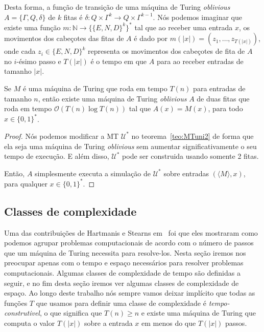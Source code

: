 Desta forma, a função de transição de uma máquina de Turing \emph{oblivious} $A = \{\Gamma, Q, \delta\}$ de $k$ fitas é $\delta: Q \times \Gamma^{k} \to Q \times \Gamma^{k - 1}$. Nós podemos imaginar que existe uma função $m: \mathbb{N} \to \{\{E, N, D\}^{k}\}^{*}$ tal que ao receber uma entrada $x$, os movimentos dos cabeçotes das fitas de $A$ é dado por $m(\lvert x \rvert) = (z_{1}, \dots, z_{T(\lvert x \rvert)})$, onde cada $z_{i} \in \{E, N, D\}^{k}$ representa os movimentos dos cabeçotes de fita de $A$ no $i$-ésimo passo e $T(\lvert x \rvert)$ é o tempo em que $A$ para ao receber entradas de tamanho $\lvert x \rvert$.

\begin{teo}

Se $M$ é uma máquina de Turing que roda em tempo $T(n)$ para entradas de tamanho $n$, então existe uma máquina de Turing \emph{oblivious} $A$ de duas fitas que roda em tempo $\mathcal{O}(T(n)\log T(n))$ tal que $A(x) = M(x)$, para todo $x \in \{0, 1\}^{*}$.

\end{teo}

\begin{proof}

Nós podemos modificar a MT $\mathcal{U}^{*}$ no teorema~\ref{teo:MTuni2} de forma que ela seja uma máquina de Turing \emph{oblivious} sem aumentar significativamente o seu tempo de execução. E além disso, $\mathcal{U}^{*}$ pode ser construida usando somente 2 fitas.

Então, $A$ simplesmente executa a simulação de $\mathcal{U}^{*}$ sobre entradas $(\langle M \rangle, x)$, para qualquer $x \in \{0, 1\}^{*}$.

\end{proof}

\subsection{Classes de complexidade}

Uma das contribuições de Hartmanis e Stearns em~\cite{hartmanis1965computational} foi que eles mostraram como podemos agrupar problemas computacionais de acordo com o número de passos que um máquina de Turing necessita para resolve-los. Nesta seção iremos nos preocupar apenas com o tempo e espaço necessários para resolver problemas computacionais. Algumas classes de complexidade de tempo são definidas a seguir, e no fim desta seção iremos ver algumas classes de complexidade de espaço. Ao longo deste trabalho nós sempre vamos deixar implícito que todas as funções $T$ que usamos para definir uma classe de complexidade é \emph{tempo-construtivel}, o que significa que $T(n) \geq n$ e existe uma máquina de Turing que computa o valor $T(\lvert x \rvert)$ sobre a entrada $x$ em menos do que $T(\lvert x \rvert)$ passos.

